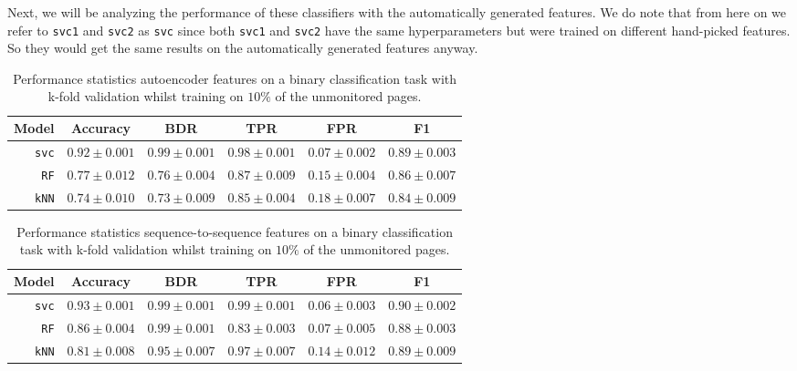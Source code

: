 Next, we will be analyzing the performance of these classifiers with the automatically generated features.
We do note that from here on we refer to \texttt{svc1} and \texttt{svc2} as \texttt{svc} since both \texttt{svc1} and \texttt{svc2} have the same hyperparameters but were trained on different hand-picked features.
So they would get the same results on the automatically generated features anyway.

\begin{table}[ht]
  \centering
  \begin{tabular}{ r  r  r  r  r  r } \hline
    \multicolumn{1}{c}{\textbf{Model}} & \multicolumn{1}{c}{\textbf{Accuracy}} & \multicolumn{1}{c}{\textbf{BDR}} & \multicolumn{1}{c}{\textbf{TPR}} &
      \multicolumn{1}{c}{\textbf{FPR}} & \multicolumn{1}{c}{\textbf{F1}} \\ \hline

    \texttt{svc} & $0.92 \pm 0.001$ & $0.99 \pm 0.001$ & $0.98 \pm 0.001$ & $0.07 \pm 0.002$ & $0.89 \pm 0.003$ \\

    \texttt{RF} & $0.77 \pm 0.012$ & $0.76 \pm 0.004$ & $0.87 \pm 0.009$ & $0.15 \pm 0.004$ & $0.86 \pm 0.007$ \\

    \texttt{kNN} & $0.74 \pm 0.010$ & $0.73 \pm 0.009$ & $0.85 \pm 0.004$ & $0.18 \pm 0.007$ & $0.84 \pm 0.009$ \\

    \hline
  \end{tabular}
  \caption{Performance statistics autoencoder features on a binary classification task with k-fold validation whilst training on $10\%$ of the unmonitored pages.}
  \label{table:ae-bin}
\end{table}

\begin{table}[ht]
  \centering
  \begin{tabular}{ r  r  r  r  r  r } \hline
    \multicolumn{1}{c}{\textbf{Model}} & \multicolumn{1}{c}{\textbf{Accuracy}} & \multicolumn{1}{c}{\textbf{BDR}} & \multicolumn{1}{c}{\textbf{TPR}} &
      \multicolumn{1}{c}{\textbf{FPR}} & \multicolumn{1}{c}{\textbf{F1}} \\ \hline

    \texttt{svc} & $0.93 \pm 0.001$ & $0.99 \pm 0.001$ & $0.99 \pm 0.001$ & $0.06 \pm 0.003$ & $0.90 \pm 0.002$ \\

    \texttt{RF} & $0.86 \pm 0.004$ & $0.99 \pm 0.001$ & $0.83 \pm 0.003$ & $0.07 \pm 0.005$ & $0.88 \pm 0.003$ \\

    \texttt{kNN} & $0.81 \pm 0.008$ & $0.95 \pm 0.007$ & $0.97 \pm 0.007$ & $0.14 \pm 0.012$ & $0.89 \pm 0.009$ \\

    \hline
  \end{tabular}
  \caption{Performance statistics sequence-to-sequence features on a binary classification task with k-fold validation whilst training on $10\%$ of the unmonitored pages.}
  \label{table:seq2seq-bin}
\end{table}


